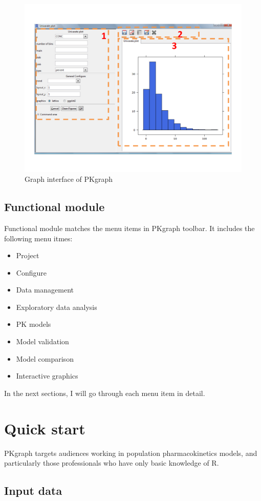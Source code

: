 \documentclass[a4paper]{article}
\begin{document}
\begin{figure}[h!tb] \centering
\includegraphics[scale=0.6]{c4_s2_2graph.pdf}
\caption{Graph interface of PKgraph}
\label{c4_s2_2}
\end{figure}
\subsection{Functional module}
Functional module matches the menu items in PKgraph toolbar. It includes the following menu itmes: \newline
\begin{itemize}
	\item Project
	\item Configure
	\item Data management
	\item Exploratory data analysis
	\item PK models
	\item Model validation
	\item Model comparison
	\item Interactive graphics
\end{itemize}
In the next sections, I will go through each menu item in detail.
\section{Quick start}
PKgraph targets audiences working in population pharmacokinetics models,
and particularly those professionals who have only basic knowledge of R.
\subsection{Input data}
\end{document}
